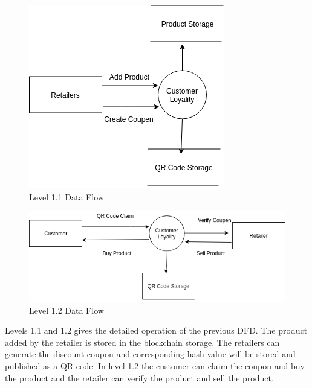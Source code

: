 \hspace{2.0mm}
\begin{figure}[H]
\includegraphics[scale=0.63]{level1_1}
\caption{Level 1.1 Data Flow}
\end{figure}
\vspace{2cm}
\begin{figure}[H]
\includegraphics[scale=0.63]{level1_2}
\caption{Level 1.2 Data Flow}
\end{figure}

\par
Levels 1.1 and 1.2 gives the detailed operation of the previous DFD. The product added by the retailer is stored in the blockchain storage. The retailers can generate the discount coupon and corresponding hash value will be stored and published as a QR code. In level 1.2 the customer can claim the coupon and buy the product and the retailer can verify the product and sell the product.
\newpage
